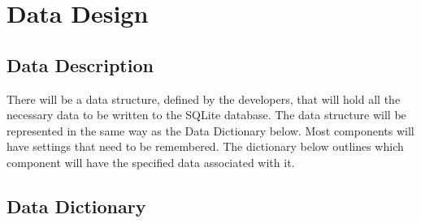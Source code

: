 \documentclass[titlepage]{article}
\begin{document}
\section{Data Design}
\subsection{Data Description}
There will be a data structure, defined by the developers, that will hold all the necessary data to be written to the SQLite database. The data structure will be represented in the same way as the Data Dictionary below. Most components will have settings that need to be remembered. The dictionary below outlines which component will have the specified data associated with it.

\subsection{Data Dictionary}
\end{document}
